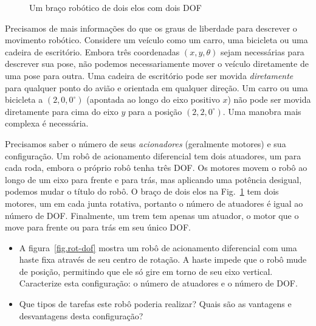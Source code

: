 {\begin{figure}
\begin{center}
\end{center}
\caption{Um braço robótico de dois elos com dois DOF}\label{fig.two-link}
\end{figure}

Precisamos de mais informações do que os graus de liberdade para descrever o movimento robótico. Considere um veículo como um carro, uma bicicleta ou uma cadeira de escritório. Embora três coordenadas $(x,y,\theta)$ sejam necessárias para descrever sua pose, não podemos necessariamente mover o veículo diretamente de uma pose para outra. Uma cadeira de escritório pode ser movida \emph{diretamente} para qualquer ponto do avião e orientada em qualquer direção. Um carro ou uma bicicleta a $(2,0,0^\circ)$ (apontada ao longo do eixo positivo $x$) não pode ser movida diretamente para cima do eixo $y$ para a posição $(2,2,0^\circ)$. Uma manobra mais complexa é necessária.

Precisamos saber o número de seus \emph{acionadores} (geralmente motores) e sua configuração. Um robô de acionamento diferencial tem dois atuadores, um para cada roda, embora o próprio robô tenha três DOF. Os motores movem o robô ao longo de um eixo para frente e para trás, mas aplicando uma potência desigual, podemos mudar o título do robô. O braço de dois elos na Fig.~\ref{fig.two-link} tem dois motores, um em cada junta rotativa, portanto o número de atuadores é igual ao número de DOF. Finalmente, um trem tem apenas um atuador, o motor que o move para frente ou para trás em seu único DOF.

\begin{framed}
\begin{itemize}
\item A figura~\ref{fig.rot-dof} mostra um robô de acionamento diferencial com uma haste fixa através de seu centro de rotação. A haste impede que o robô mude de posição, permitindo que ele só gire em torno de seu eixo vertical. Caracterize esta configuração: o número de atuadores e o número de DOF.
\item Que tipos de tarefas este robô poderia realizar? Quais são as vantagens e desvantagens desta configuração?
\end{itemize}
\end{framed}

}
